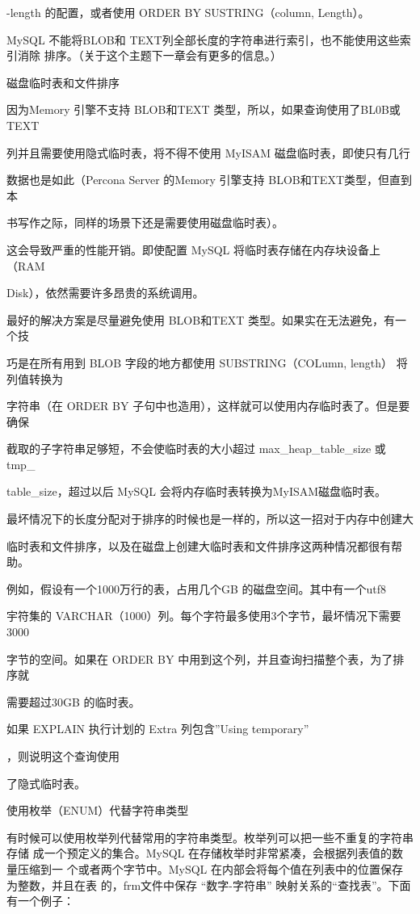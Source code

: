 -length 的配置，或者使用 ORDER BY SUSTRING（column, Length）。

MySQL 不能将BLOB和 TEXT列全部长度的字符串进行索引，也不能使用这些索引消除
排序。（关于这个主题下一章会有更多的信息。）

磁盘临时表和文件排序

因为Memory 引擎不支持 BLOB和TEXT 类型，所以，如果查询使用了BL0B或TEXT

列并且需要使用隐式临时表，将不得不使用 MyISAM 磁盘临时表，即使只有几行

数据也是如此（Percona Server 的Memory 引擎支持 BLOB和TEXT类型，但直到本

书写作之际，同样的场景下还是需要使用磁盘临时表）。

这会导致严重的性能开销。即使配置 MySQL 将临时表存储在内存块设备上（RAM

Disk），依然需要许多昂贵的系统调用。

最好的解决方案是尽量避免使用 BLOB和TEXT 类型。如果实在无法避免，有一个技

巧是在所有用到 BLOB 字段的地方都使用 SUBSTRING（COLumn, length） 将列值转换为

字符串（在 ORDER BY 子句中也造用），这样就可以使用内存临时表了。但是要确保

截取的子字符串足够短，不会使临时表的大小超过 max\_heap\_table\_size 或 tmp\_

table\_size，超过以后 MySQL 会将内存临时表转换为MyISAM磁盘临时表。

最坏情况下的长度分配对于排序的时候也是一样的，所以这一招对于内存中创建大

临时表和文件排序，以及在磁盘上创建大临时表和文件排序这两种情况都很有帮助。

例如，假设有一个1000万行的表，占用几个GB 的磁盘空间。其中有一个utf8

宇符集的 VARCHAR（1000）列。每个字符最多使用3个字节，最坏情况下需要3000

字节的空间。如果在 ORDER BY 中用到这个列，并且查询扫描整个表，为了排序就

需要超过30GB 的临时表。

如果 EXPLAIN 执行计划的 Extra 列包含”Using temporary”

，则说明这个查询使用

了隐式临时表。

使用枚举（ENUM）代替字符串类型

有时候可以使用枚举列代替常用的字符串类型。枚举列可以把一些不重复的字符串存储
成一个预定义的集合。MySQL 在存储枚举时非常紧凑，会根据列表值的数量压缩到一
个或者两个字节中。MySQL 在内部会将每个值在列表中的位置保存为整数，并且在表
的，frm文件中保存 “数字-字符串” 映射关系的“查找表”。下面有一个例子：

